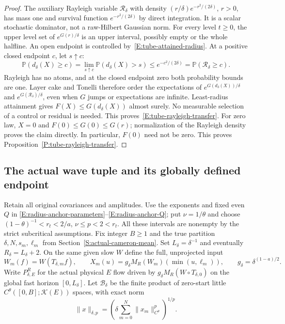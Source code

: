 \begin{proof}
  The auxiliary Rayleigh variable $\mathcal R_\delta$ with density
  $(r/\delta)e^{-r^2/(2\delta)}$, $r>0$, has mass one and
  survival function $e^{-r^2/(2\delta)}$ by direct integration.
  It is a scalar stochastic dominator, not a raw-Hilbert Gaussian norm.
  For every level $t\ge0$, the upper level set of $e^{G(r)/\delta}$
  is an upper interval, possibly empty or the whole halfline.
  An open endpoint is controlled by~\eqref{E:tube-attained-radius}.
  At a positive closed endpoint $c$, let $s\uparrow c$:
  \[
    \mathbb P(d_\delta(X)\ge c)
    =\lim_{s\uparrow c}\mathbb P(d_\delta(X)>s)
    \le e^{-c^2/(2\delta)}
    =\mathbb P(\mathcal R_\delta\ge c).
  \]
  Rayleigh has no atoms, and at the closed endpoint zero both
  probability bounds are one.
  Layer cake and Tonelli therefore order the expectations of
  $e^{G(d_\delta(X))/\delta}$ and $e^{G(\mathcal R_\delta)/\delta}$,
  even when $G$ jumps or expectations are infinite.
  Least-radius attainment gives $F(X)\le G(d_\delta(X))$
  almost surely. No measurable selection of a control or residual is needed.
  This proves~\eqref{E:tube-rayleigh-transfer}.
  For zero law, $X=0$ and $F(0)\le G(0)\le G(r)$;
  normalization of the Rayleigh density proves the claim directly.
  In particular, $F(0)$ need not be zero.
  This proves Proposition~\ref{P:tube-rayleigh-transfer}.
\end{proof}

\subsection{The actual wave tuple and its globally defined endpoint}

Retain all original covariances and amplitudes.
Use the exponents and fixed even $Q$ in
\eqref{E:radius-anchor-parameters}--\eqref{E:radius-anchor-Q};
put $\nu=1/\theta$ and choose
$(1-\theta)^{-1}<r_t<2/a$, $\nu\le p<2<r_t$.
All these intervals are nonempty by the strict subcritical assumptions.
Fix integer $B\ge1$ and the true partition
$\delta,N,s_m,\ell_m$ from Section~\ref{S:actual-cameron-mean}.
Set $L_\delta=\delta^{-1}$ and eventually $R_\delta=L_\delta+2$.
On the same given slow $W$ define the full, unprojected input
\begin{equation}\label{E:tube-actual-input}
  W_m(f)=W(T_{\delta,m}f),\qquad
  X_m(u)=g_\delta M_R(W_m)(\min(u,\ell_m)),\qquad
  g_\delta=\delta^{(1-a)/2}.
\end{equation}
Write $P_{\delta,E}^R$ for the actual physical $E$ flow driven by
$g_\delta M_R(W\circ T_{\delta,0})$ on the global fast horizon $[0,L_\delta]$.
Let $\mathscr B_\delta$ be the finite product of zero-start
little $C^\theta([0,B];\mathcal K(E))$ spaces, with exact norm
\[
  \|x\|_{\delta,p}=\left(\delta\sum_{m=0}^N
  \|x_m\|_{C^\theta}^p\right)^{1/p}.
\]

